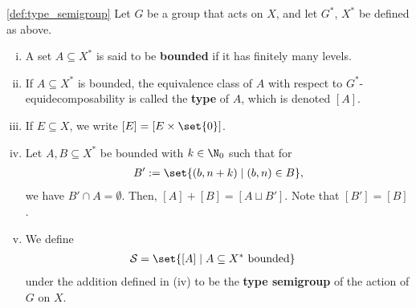 \begin{definition}\ref{def:type_semigroup}
  Let $G$ be a group that acts on $X$, and let $G^{\ast}$, $X^{\ast}$ be defined as above.
  \begin{enumerate}[(i)]
    \item A set $A\subseteq X^{\ast}$ is said to be \textbf{bounded} if it has finitely many levels.
    \item If $A\subseteq X^{\ast}$ is bounded, the equivalence class of $A$ with respect to $G^{\ast}$-equidecomposability is called the \textbf{type} of $A$, which is denoted $\left[A\right]$.
    \item If $E\subseteq X$, we write $\left[E\right] = \left[E\times \set{0}\right]$.
    \item Let $A,B\subseteq X^{\ast}$ be bounded with $k\in \N_{0}$ such that for
      \begin{align*}
        B' := \set{\left(b,n+k\right)\mid \left(b,n\right)\in B},
      \end{align*}
      we have $B'\cap A = \emptyset$. Then, $\left[A\right] + \left[B\right] = \left[A\sqcup B'\right]$. Note that $\left[B'\right] = \left[B\right]$.
    \item We define
      \begin{align*}
        \mathcal{S} &= \set{\left[A\right]\mid A\subseteq X^{\ast}\text{ bounded}}
      \end{align*}
      under the addition defined in (iv) to be the \textbf{type semigroup} of the action of $G$ on $X$.
  \end{enumerate}
\end{definition}


